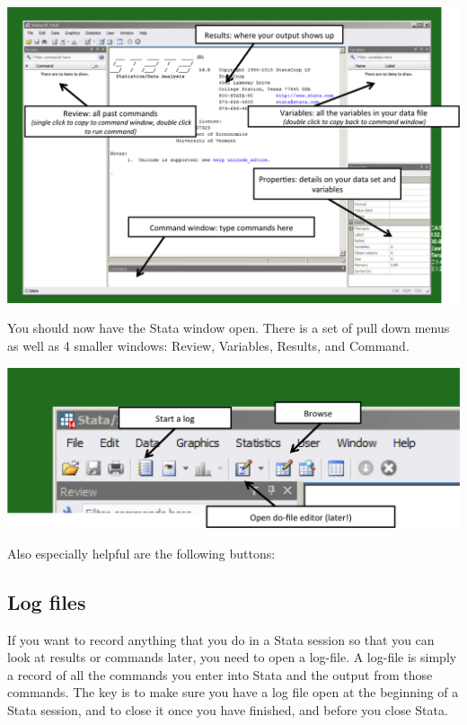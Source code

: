 \documentclass[11pt]{article}
\begin{document}
\includegraphics[scale=0.3]{stata1.png}

You should now have the Stata window open. There is a set of pull down
menus as well as 4 smaller windows: Review, Variables, Results, and
Command.

\includegraphics[scale=0.5]{stata2.png}


Also especially helpful are the following buttons:

\hypertarget{log-files}{%
\subsection*{Log files}\label{log-files}}

If you want to record anything that you do in a Stata session so that
you can look at results or commands later, you need to open a log-file.
A log-file is simply a record of all the commands you enter into Stata
and the output from those commands. The key is to make sure you have a
log file open at the beginning of a Stata session, and to close it once
you have finished, and before you close Stata.
\end{document}
